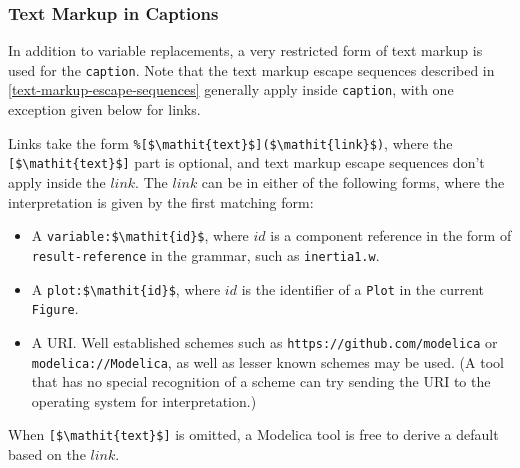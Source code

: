\subsubsection{Text Markup in Captions}\label{text-markup-in-captions}

In addition to variable replacements, a very restricted form of text markup is used for the \lstinline!caption!.  Note that the text markup escape sequences described in \cref{text-markup-escape-sequences} generally apply inside \lstinline!caption!, with one exception given below for links.

Links take the form \lstinline!%[$\mathit{text}$]($\mathit{link}$)!, where the \lstinline![$\mathit{text}$]! part is optional, and text markup escape sequences don't apply inside the $\mathit{link}$.  The $\mathit{link}$ can be in either of the following forms, where the interpretation is given by the first matching form:
\begin{itemize}
\item
A \lstinline!variable:$\mathit{id}$!, where $\mathit{id}$ is a component reference in the form of \lstinline[language=grammar]!result-reference! in the grammar, such as \lstinline!inertia1.w!.
\item
A \lstinline!plot:$\mathit{id}$!, where $\mathit{id}$ is the identifier of a \lstinline!Plot! in the current \lstinline!Figure!.
\item
A URI.
Well established schemes such as \lstinline[language={[nocomment]modelica}]!https://github.com/modelica! or \lstinline[language={[nocomment]modelica}]!modelica://Modelica!, as well as lesser known schemes may be used.
(A tool that has no special recognition of a scheme can try sending the URI to the operating system for interpretation.)
\end{itemize}

When \lstinline![$\mathit{text}$]! is omitted, a Modelica tool is free to derive a default based on the $\mathit{link}$.

